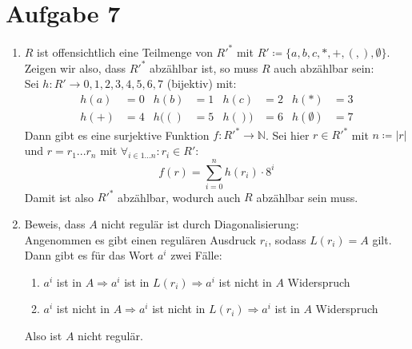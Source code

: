 \documentclass[a4paper,11pt]{scrartcl}
\begin{document}
	\section*{Aufgabe 7}
	\begin{enumerate}[label=\alph*)]
	\item 	$R$ ist offensichtlich eine Teilmenge von ${R'}^*$ mit $R' \coloneqq \{a,b,c,*,+,(,),\emptyset \}$.\\
			Zeigen wir also, dass ${R'}^*$ abzählbar ist, so muss $R$ auch abzählbar sein:\\
			Sei $h:R'\rightarrow {0,1,2,3,4,5,6,7}$ (bijektiv) mit:
			\begin{align*}
			h(a) &= 0		&	h(b) &= 1		&	h(c) &= 2		&	h(*) &= 3	\\
			h(+) &= 4		&	h(() &= 5		&	h()) &= 6		&	h(\emptyset ) &= 7
			\end{align*}
			Dann gibt es eine surjektive Funktion $f:{R'}^* \rightarrow \mathbb{N}$. Sei hier $r \in {R'}^*$ mit $n \coloneqq \vert r \vert$ und $r = r_1 ... r_n$ mit ${\forall}_{i\in 1...n}: r_i \in R'$: \\
			\[f(r) = \sum_{i=0}^{n} h(r_i) \cdot 8^i\]
			Damit ist also ${R'}^*$ abzählbar, wodurch auch $R$ abzählbar sein muss.
			
	\item	Beweis, dass $A$ nicht regulär ist durch Diagonalisierung:\\
			Angenommen es gibt einen  regulären Ausdruck $r_i$, sodass $L(r_i)=A$ gilt. Dann gibt es für das Wort $a^i$ zwei Fälle:
			\begin{enumerate}[label=\arabic*)]
				\item $a^i$ ist in $A \Rightarrow a^i$ ist in $L(r_i) \Rightarrow a^i$ ist nicht in $A$ \lightning  Widerspruch
			\item $a^i$ ist nicht in $A \Rightarrow a^i$ ist nicht in $L(r_i) \Rightarrow a^i$ ist in $A$ \lightning  Widerspruch
			\end{enumerate}
			Also ist $A$ nicht regulär.
	
\newpage	
	

\end{enumerate}
\end{document}
